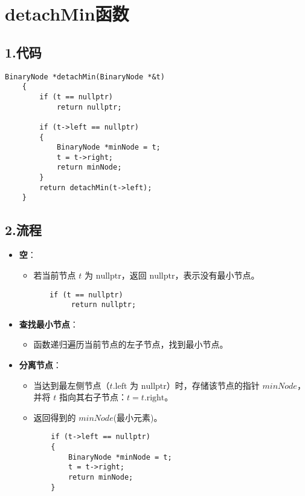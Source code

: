 \documentclass[a4paper]{article}
\begin{document}
\section*{detachMin函数}
\subsection*{1.代码}
\begin{lstlisting}
BinaryNode *detachMin(BinaryNode *&t)
    {
        if (t == nullptr)
            return nullptr;

        if (t->left == nullptr)
        {
            BinaryNode *minNode = t;
            t = t->right;
            return minNode;
        }
        return detachMin(t->left);
    }
\end{lstlisting}
\subsection*{2.流程}
\begin{itemize}
    \item \textbf{空}：
    \begin{itemize}
        \item 若当前节点 $t$ 为 $\text{nullptr}$，返回 $\text{nullptr}$，表示没有最小节点。
    \end{itemize}
    \begin{lstlisting}
       if (t == nullptr)
            return nullptr;
    \end{lstlisting}
    \item \textbf{查找最小节点}：
    \begin{itemize}
        \item 函数递归遍历当前节点的左子节点，找到最小节点。
    \end{itemize}
    
    \item \textbf{分离节点}：
    \begin{itemize}
        \item 当达到最左侧节点（$t.\text{left}$ 为 $\text{nullptr}$）时，存储该节点的指针 $minNode$，并将 $t$ 指向其右子节点：$t = t.\text{right}$。
        \item 返回得到的 $minNode$(最小元素)。
        \begin{lstlisting}
    if (t->left == nullptr)
    {
        BinaryNode *minNode = t;
        t = t->right;
        return minNode;
    }
        \end{lstlisting}
    \end{itemize}
\end{itemize}
\newpage
\end{document}
